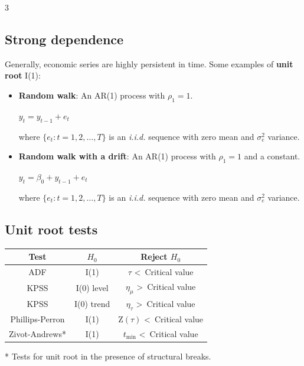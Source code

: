 \documentclass[10pt, a4paper, landscape]{article}
\begin{document}
\begin{multicols}{3}
\subsection*{Strong dependence}

Generally, economic series are highly persistent in time. Some examples of \textbf{unit root} I(1):

\begin{itemize}[leftmargin=*]
	\item \textbf{Random walk}: An AR(1) process with \( \rho_{1} = 1 \).
	\begin{center}
		\( y_{t} = y_{t - 1} + e_{t} \)
	\end{center}
	where \( \{ e_{t} : t = 1, 2, \ldots, T \} \) is an \textsl{i.i.d.} sequence with zero mean and \( \sigma_{e}^{2} \) variance.
	\item \textbf{Random walk with a drift}: An AR(1) process with \( \rho_{1} = 1 \) and a constant.
	\begin{center}
		\( y_{t} = \beta_{0} + y_{t - 1} + e_{t} \)
	\end{center}
	where \( \{ e_{t} : t = 1, 2, \ldots, T \} \) is an \textsl{i.i.d.} sequence with zero mean and \( \sigma_{e}^{2} \) variance.
\end{itemize}

\subsection*{Unit root tests}

\begin{center}
	\begin{tabular}{ c c c }
		Test            & \( H_{0} \) & Reject \( H_{0} \)                                 \\ \hline
		ADF             & I(1)        & \( \tau \) \textless \, Critical value             \\
		KPSS            & I(0) level  & \( \eta_{\mu} \) \textgreater \, Critical value    \\
		KPSS            & I(0) trend  & \( \eta_{\tau} \) \textgreater \, Critical value   \\
		Phillips-Perron & I(1)        & \( \mathrm{Z}(\tau) \) \textless \, Critical value \\
		Zivot-Andrews*  & I(1)        & \( t_{\mathrm{min}} \) \textless \, Critical value
	\end{tabular}
\end{center}

* Tests for unit root in the presence of structural breaks.


\end{multicols}
\end{document}
